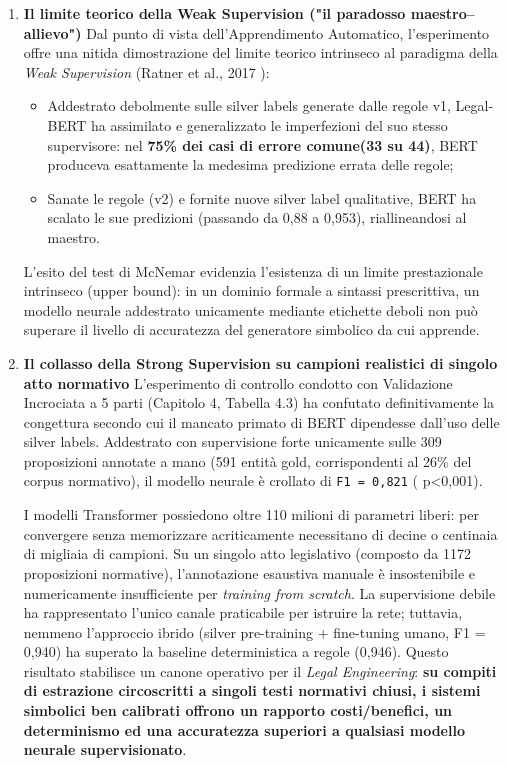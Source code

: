 \documentclass[12pt,a4paper,oneside]{report}
\begin{document}
\begin{enumerate}
\item \textbf{Il limite teorico della Weak Supervision ("il paradosso maestro–allievo")}
Dal punto di vista dell'Apprendimento Automatico, l'esperimento offre una nitida dimostrazione del limite teorico intrinseco al paradigma della \textit{Weak Supervision} (Ratner et al., 2017 \cite{ratner2017snorkel}):
\begin{itemize}
    \item Addestrato debolmente sulle silver labels generate dalle regole v1, Legal-BERT ha assimilato e generalizzato le imperfezioni del suo stesso supervisore: nel \textbf{75\% dei casi di errore comune(33 su 44)}, BERT produceva esattamente la medesima predizione errata delle regole;
    \item Sanate le regole (v2) e fornite nuove silver label qualitative, BERT ha scalato le sue predizioni (passando da 0,88 a 0,953), riallineandosi al maestro.
\end{itemize}
L'esito del test di McNemar evidenzia l'esistenza di un limite prestazionale intrinseco (upper bound): in un dominio formale a sintassi prescrittiva, un modello neurale addestrato unicamente mediante etichette deboli non può superare il livello di accuratezza del generatore simbolico da cui apprende.

\item \textbf{ Il collasso della Strong Supervision su campioni realistici di singolo atto normativo}
L'esperimento di controllo condotto con Validazione Incrociata a 5 parti (Capitolo 4, Tabella 4.3) ha confutato definitivamente la congettura secondo cui il mancato primato di BERT dipendesse dall'uso delle silver labels. Addestrato con supervisione forte unicamente sulle 309 proposizioni annotate a mano (591 entità gold, corrispondenti al 26\% del corpus normativo), il modello neurale è crollato di \texttt{F1 = 0,821} ( p<0,001).

I modelli Transformer possiedono oltre 110 milioni di parametri liberi: per convergere senza memorizzare acriticamente  necessitano di decine o centinaia di migliaia di campioni. Su un singolo atto legislativo (composto da 1172 proposizioni normative), l'annotazione esaustiva manuale è insostenibile e numericamente insufficiente per \textit{training from scratch}. La supervisione debile ha rappresentato l'unico canale praticabile per istruire la rete; tuttavia, nemmeno l'approccio ibrido (silver pre-training + fine-tuning umano, F1 = 0,940) ha superato la baseline deterministica a regole (0,946). Questo risultato stabilisce un canone operativo per il \textit{Legal Engineering}: \textbf{su compiti di estrazione circoscritti a singoli testi normativi chiusi, i sistemi simbolici ben calibrati offrono un rapporto costi/benefici, un determinismo ed una accuratezza superiori a qualsiasi modello neurale supervisionato}.



\end{enumerate}
\end{document}
